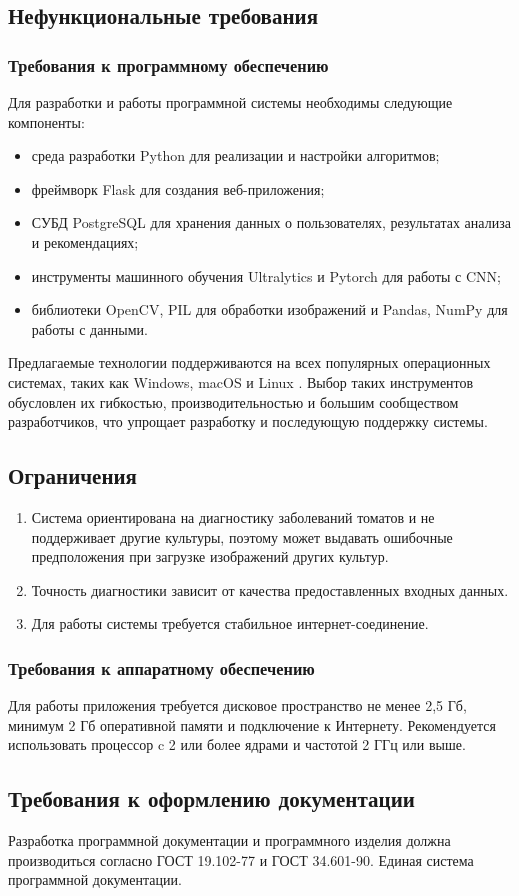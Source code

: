 \subsection{Нефункциональные требования}

\subsubsection{Требования к программному обеспечению}

Для разработки и работы программной системы необходимы следующие компоненты:
\begin{itemize}
	\item среда разработки Python для реализации и настройки алгоритмов;
	\item фреймворк Flask для создания веб-приложения;
	\item СУБД PostgreSQL для хранения данных о пользователях, результатах анализа и рекомендациях;
	\item инструменты машинного обучения Ultralytics и Pytorch для работы с CNN;
	\item библиотеки OpenCV, PIL для обработки изображений и Pandas, NumPy для работы с данными.
\end{itemize}

Предлагаемые технологии поддерживаются на всех популярных операционных системах, таких как Windows, macOS и Linux \cite{python1}. Выбор таких инструментов обусловлен их гибкостью, производительностью и большим сообществом разработчиков, что упрощает разработку и последующую поддержку системы.

\subsection{Ограничения}

\begin{enumerate}
	\item Система ориентирована на диагностику заболеваний томатов и не поддерживает другие культуры, поэтому может выдавать ошибочные предположения при загрузке изображений других культур.
	\item Точность диагностики зависит от качества предоставленных входных данных.
	\item Для работы системы требуется стабильное интернет-соединение.
\end{enumerate}

\subsubsection{Требования к аппаратному обеспечению}
Для работы приложения требуется дисковое пространство не менее 2,5 Гб, минимум 2 Гб оперативной памяти и подключение к Интернету. Рекомендуется использовать процессор c 2 или более ядрами и частотой 2 ГГц или выше.

\subsection{Требования к оформлению документации}

Разработка программной документации и программного изделия должна производиться согласно ГОСТ 19.102-77 и ГОСТ 34.601-90. Единая система программной документации.
